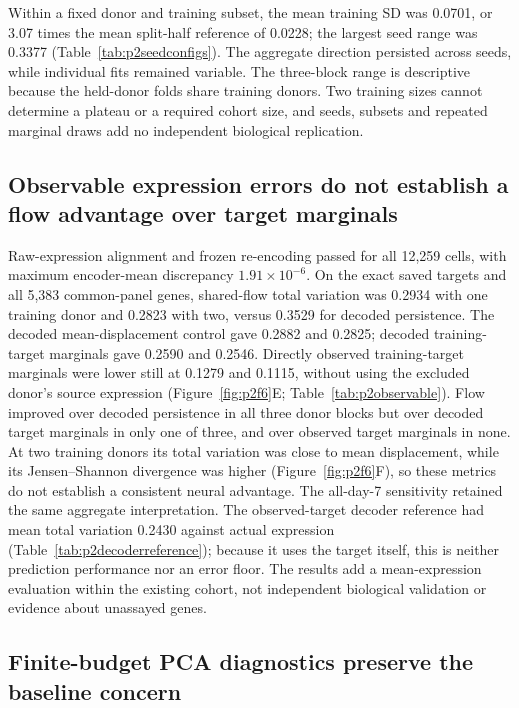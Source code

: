 \documentclass[10pt,a4paper]{article}
\begin{document}
Within a fixed donor and training subset, the mean training SD was 0.0701, or 3.07 times the mean split-half reference of 0.0228; the largest seed range was 0.3377 (Table~\ref{tab:p2seedconfigs}). The aggregate direction persisted across seeds, while individual fits remained variable. The three-block range is descriptive because the held-donor folds share training donors. Two training sizes cannot determine a plateau or a required cohort size, and seeds, subsets and repeated marginal draws add no independent biological replication.

\subsection{Observable expression errors do not establish a flow advantage over target marginals}

Raw-expression alignment and frozen re-encoding passed for all 12,259 cells, with maximum encoder-mean discrepancy $1.91\times10^{-6}$. On the exact saved targets and all 5,383 common-panel genes, shared-flow total variation was 0.2934 with one training donor and 0.2823 with two, versus 0.3529 for decoded persistence. The decoded mean-displacement control gave 0.2882 and 0.2825; decoded training-target marginals gave 0.2590 and 0.2546. Directly observed training-target marginals were lower still at 0.1279 and 0.1115, without using the excluded donor's source expression (Figure~\ref{fig:p2f6}E; Table~\ref{tab:p2observable}). Flow improved over decoded persistence in all three donor blocks but over decoded target marginals in only one of three, and over observed target marginals in none. At two training donors its total variation was close to mean displacement, while its Jensen--Shannon divergence was higher (Figure~\ref{fig:p2f6}F), so these metrics do not establish a consistent neural advantage. The all-day-7 sensitivity retained the same aggregate interpretation. The observed-target decoder reference had mean total variation 0.2430 against actual expression (Table~\ref{tab:p2decoderreference}); because it uses the target itself, this is neither prediction performance nor an error floor. The results add a mean-expression evaluation within the existing cohort, not independent biological validation or evidence about unassayed genes.

\subsection{Finite-budget PCA diagnostics preserve the baseline concern}
\end{document}
